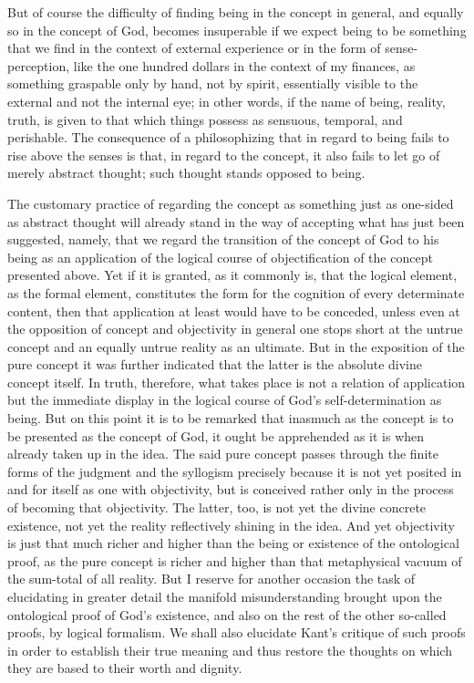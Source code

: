 But of course the difficulty of finding
being in the concept in general,
and equally so in the concept of God,
becomes insuperable if we expect
being to be something that
we find in the context of external experience
or in the form of sense-perception,
like the one hundred dollars
in the context of my finances,
as something graspable only by hand,
not by spirit, essentially visible to
the external and not the internal eye;
in other words, if the name of
being, reality, truth, is given
to that which things possess
as sensuous, temporal, and perishable.
The consequence of a philosophizing
that in regard to being fails
to rise above the senses is
that, in regard to the concept,
it also fails to let go of
merely abstract thought;
such thought stands opposed to being.

The customary practice of regarding
the concept as something just as one-sided
as abstract thought will already stand in the way
of accepting what has just been suggested,
namely, that we regard the transition of
the concept of God to his being as
an application of the logical course
of objectification of the concept presented above.
Yet if it is granted, as it commonly is,
that the logical element, as the formal element,
constitutes the form for the cognition
of every determinate content,
then that application at least
would have to be conceded,
unless even at the opposition of
concept and objectivity in general
one stops short at the untrue concept
and an equally untrue reality as an ultimate.
But in the exposition of the pure concept
it was further indicated that the latter is
the absolute divine concept itself.
In truth, therefore, what takes place is
not a relation of application
but the immediate display in the logical course
of God's self-determination as being.
But on this point it is to be remarked
that inasmuch as the concept is to be
presented as the concept of God,
it ought be apprehended as it is
when already taken up in the idea.
The said pure concept passes through
the finite forms of the judgment
and the syllogism precisely
because it is not yet posited
in and for itself as one with objectivity,
but is conceived rather only in
the process of becoming that objectivity.
The latter, too, is not yet the divine concrete existence,
not yet the reality reflectively shining in the idea.
And yet objectivity is just that much richer and higher
than the being or existence of the ontological proof,
as the pure concept is richer and
higher than that metaphysical vacuum
of the sum-total of all reality.
But I reserve for another occasion
the task of elucidating in greater detail
the manifold misunderstanding brought
upon the ontological proof of God's existence,
and also on the rest of the other so-called proofs,
by logical formalism.
We shall also elucidate Kant's critique of such proofs
in order to establish their true meaning
and thus restore the thoughts on which they are based
to their worth and dignity.

